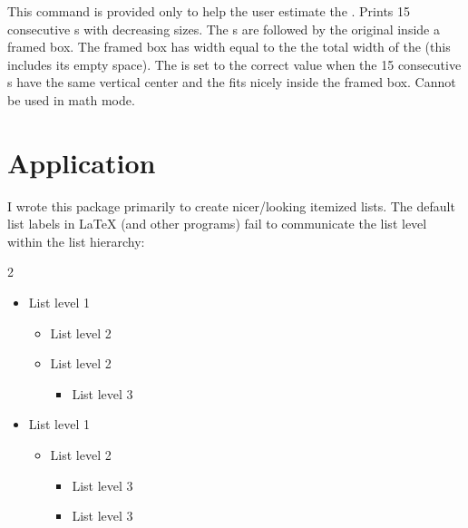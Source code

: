 \documentclass{beery}
\begin{document}
\begin{mydisplaycode}
\end{mydisplaycode}

This command is provided only to help the user estimate the \textbulletfactor{}.
Prints \num{15} consecutive s with decreasing sizes.
The s are followed by the original  inside a framed box.
The framed box has width equal to the \textbulletfactor{} \texttimes{} the total width of the  (this includes its empty space).
The \textbulletfactor{} is set to the correct value when the \num{15} consecutive s have the same vertical center and the  fits nicely inside the framed box.
Cannot be used in math mode.


\section{Application}
\label{sec:application}

I wrote this package primarily to create nicer\-/looking itemized lists.
The default list labels in \LaTeX{} (and other programs) fail to communicate the list level within the list hierarchy:

\begin{multicols}{2}
  \begin{itemize}[label=\textbullet]
    \item List level 1
    \begin{itemize}[label=\textbf{--}]
      \item List level 2
      \item List level 2
      \begin{itemize}[label=\textasteriskcentered]
        \item List level 3
      \end{itemize}
    \end{itemize}
    \item List level 1
    \begin{itemize}[label=\textbf{--}]
      \item List level 2
      \begin{itemize}[label=\textasteriskcentered]
        \item List level 3
        \item List level 3
      \end{itemize}
    \end{itemize}
  \end{itemize}
\end{multicols}
\end{document}
